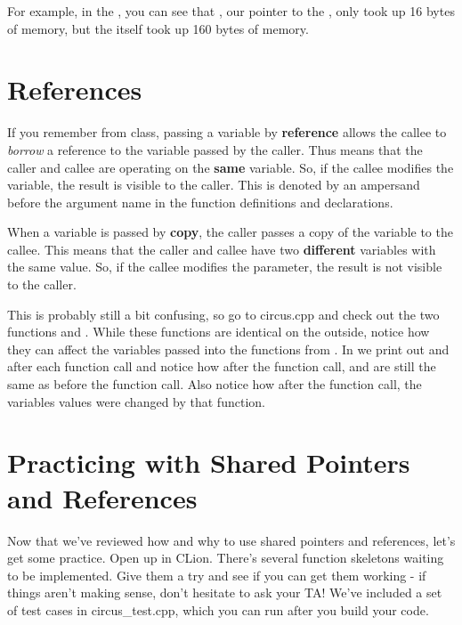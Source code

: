\documentclass{tufte-handout}
\begin{document}
For example, in the , you can see that , our pointer to the , only took up 16 bytes of memory, but the  itself took up 160 bytes of memory. 

\section{References}
If you remember from class, passing a variable by \textbf{reference} allows the callee to \textit{borrow} a reference to the variable passed by the caller. Thus means that the caller and callee are operating on the \textbf{same} variable. So, if the callee modifies the variable, the result is visible to the caller. 
This is denoted by an ampersand before the argument name in the function definitions and declarations.

When a variable is passed by \textbf{copy}, the caller passes a copy of the variable to the callee. This means that the caller and callee have two \textbf{different} variables with the same value. So, if the callee modifies the parameter, the result is not visible to the caller.

This is probably still a bit confusing, so go to circus.cpp and check out the two functions  and .  
While these functions are identical on the outside, notice how they can affect the variables passed into the functions from . 
In  we print out  and  after each function call and notice how after the  function call,  and  are still the same as before the function call.
Also notice how after the  function call, the variables values were changed by that function.

\section{Practicing with Shared Pointers and References}
Now that we've reviewed how and why to use shared pointers and references, let's get some practice. Open up  in CLion. 
There's several function skeletons waiting to be implemented. 
Give them a try and see if you can get them working - if things aren't making sense, don't hesitate to ask your TA!
We've included a set of test cases in circus\_test.cpp, which you can run after you build your code. 
\end{document}
